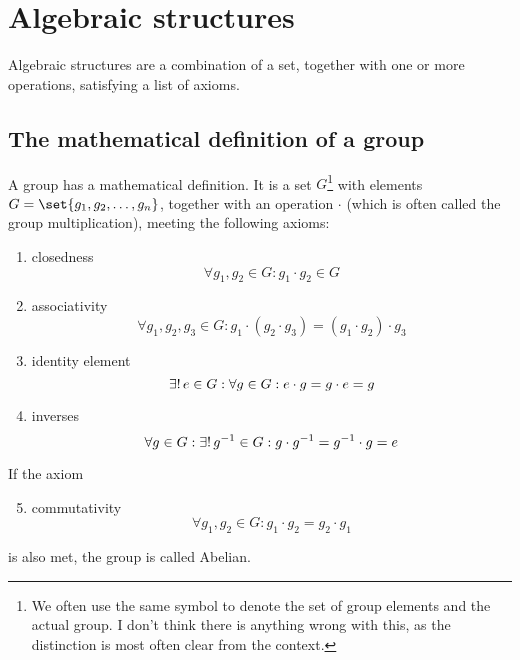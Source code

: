 \section{Algebraic structures}
    Algebraic structures are a combination of a set, together with one or more operations, satisfying a list of axioms.

    \subsection{The mathematical definition of a group} \label{sec:group_def}
        A group has a mathematical definition. It is a set $G$\footnote{We often use the same symbol to denote the set of group elements and the actual group. I don't think there is anything wrong with this, as the distinction is most often clear from the context.} with elements $G=\set{g_1, g_2, \dots, g_n}$, together with an operation $\cdot$ (which is often called the group multiplication), meeting the following axioms:
        \begin{enumerate}
            \item closedness
            \begin{equation}
                \forall g_1, g_2 \in G: g_1 \cdot g_2 \in G
            \end{equation}

            \item associativity
            \begin{equation}
                \forall g_1, g_2, g_3 \in G: g_1 \cdot (g_2 \cdot g_3) = (g_1 \cdot g_2) \cdot g_3
            \end{equation}

            \item identity element
            \begin{equation} \label{eq:group_id}
                \exists! \thinspace e \in G: \forall g \in G: e \cdot g = g \cdot e = g
            \end{equation}

            \item inverses
            \begin{equation}
                \forall g \in G: \exists! \thinspace g^{-1} \in G: g \cdot g^{-1} = g^{-1} \cdot g = e
            \end{equation}
        \end{enumerate}
        If the axiom
        \begin{enumerate}
            \setcounter{enumi}{4}
            \item commutativity
            \begin{equation}
                \forall g_1, g_2 \in G: g_1 \cdot g_2 = g_2 \cdot g_1
            \end{equation}
        \end{enumerate}
        is also met, the group is called Abelian. \\


